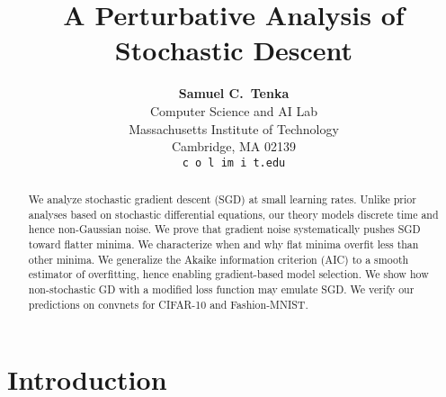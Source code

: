 \documentclass{article}
\title{%
    A Perturbative Analysis of Stochastic Descent
}
\author{%
    \textbf{Samuel C.~Tenka} \\
    Computer Science and AI Lab \\
    Massachusetts Institute of Technology \\
    Cambridge, MA 02139 \\
    \texttt{c\,o\,l\,i\!{\tin\tiny@\tin}m\,i\,t.edu}
}
\theoremstyle{plain}
\theoremstyle{definition}
\begin{document}
    \maketitle

    
    
    \begin{abstract}
        We analyze stochastic gradient descent (SGD) at small learning rates.
        Unlike prior analyses based on stochastic differential equations, our
        theory models discrete time and hence non-Gaussian noise.
        We prove that gradient noise systematically pushes SGD toward flatter
        minima.  We characterize when and why flat minima overfit less than
        other minima.  We generalize the Akaike information criterion (AIC) to
        a smooth estimator of overfitting, hence enabling gradient-based model
        selection.  We show how non-stochastic GD with a modified loss function
        may emulate SGD.
        We verify our predictions on convnets for CIFAR-10 and Fashion-MNIST.
    \end{abstract}
    

\section{Introduction}


\end{document}
